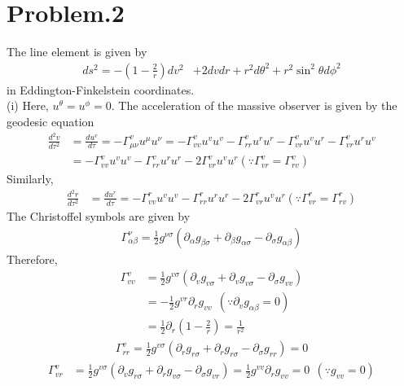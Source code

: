 \documentclass[12pt]{article}
\begin{document}
\section*{Problem.2}
The line element is given by
\begin{align}
ds^2 = - \left(1 - \frac{2}{r} \right) dv^2 & + 2 dv dr + r^2 d\theta^2 + r^2 \sin^2{\theta} d\phi^2
\end{align}
in Eddington-Finkelstein coordinates.\\
(i) Here, $u^{\theta} = u^{\phi} = 0$. The acceleration of the massive observer is given by the geodesic equation
\begin{align}
\frac{d^2 v}{d \tau^2} &= \frac{d u^{v}}{d \tau} = - \Gamma^{v}_{\mu \nu} u^{\mu} u^{\nu} = - \Gamma^{v}_{vv} u^{v} u^{v} - \Gamma^{v}_{r r} u^{r} u^{r} - \Gamma^{v}_{v r} u^{v} u^{r} - \Gamma^{v}_{v r} u^{r} u^{v} \nonumber \\
&= - \Gamma^{v}_{vv} u^{v} u^{v} - \Gamma^{v}_{r r} u^{r} u^{r} - 2 \Gamma^{v}_{v r} u^{v} u^{r} \left(\because \Gamma^{v}_{v r} = \Gamma^{v}_{r v}\right)
\end{align}
Similarly,
\begin{align}
\frac{d^2 r}{d \tau^2} &= \frac{d u^{r}}{d \tau} = - \Gamma^{r}_{vv} u^{v} u^{v} - \Gamma^{r}_{r r} u^{r} u^{r} - 2 \Gamma^{r}_{v r} u^{v} u^{r} \left(\because \Gamma^{r}_{v r} = \Gamma^{r}_{r v}\right)
\end{align}
The Christoffel symbols are given by
\begin{align}
\Gamma^{\nu}_{\alpha \beta} = \frac{1}{2} g^{\nu \sigma} \left(\partial_{\alpha} g_{\beta \sigma} + \partial_{\beta} g_{\alpha \sigma} - \partial_{\sigma} g_{\alpha \beta}\right)
\end{align}
Therefore,
\begin{align}
\Gamma^{v}_{vv} &= \frac{1}{2} g^{v \sigma} \left(\partial_{v} g_{v \sigma} + \partial_{v} g_{v \sigma} - \partial_{\sigma} g_{vv}\right)\\
&= - \frac{1}{2} g^{v r} \partial_{r} g_{vv} ~~\left(\because \partial_{v} g_{\alpha \beta} = 0 \right) \\
&= \frac{1}{2} \partial_{r} \left(1 - \frac{2}{r} \right) = \frac{1}{r^2}
\end{align}
\begin{align}
\Gamma^{v}_{rr} = \frac{1}{2} g^{v \sigma} \left(\partial_{r} g_{r \sigma} + \partial_{r} g_{r \sigma} - \partial_{\sigma} g_{r r}\right) 
= 0
\end{align}
\begin{align}
\Gamma^{v}_{v r} &= \frac{1}{2} g^{v \sigma} \left(\partial_{v} g_{r \sigma} + \partial_{r} g_{v \sigma} - \partial_{\sigma} g_{v r}\right) = \frac{1}{2} g^{v v} \partial_{r} g_{v v} = 0 ~~\left(\because g_{v v} = 0 \right)
\end{align}
\end{document}
